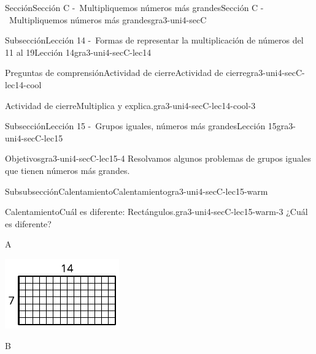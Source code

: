 \documentclass[twoside,10pt,]{article}
\begin{document}
\begin{sectionptx}{Sección}{Sección C -~Multipliquemos números más grandes}{}{Sección C -~Multipliquemos números más grandes}{}{}{gra3-uni4-secC}
\begin{subsectionptx}{Subsección}{Lección 14 -~Formas de representar la multiplicación de números del 11 al 19}{}{Lección 14}{}{}{gra3-uni4-secC-lec14}
\begin{reading-questions-subsubsection}{Preguntas de comprensión}{Actividad de cierre}{}{Actividad de cierre}{}{}{gra3-uni4-secC-lec14-cool}
\begin{project}{Actividad de cierre}{Multiplica y explica.}{gra3-uni4-secC-lec14-cool-3}
\begin{sidebyside}{2}{0}{0}{0}
\end{sidebyside}%
\end{project}%
\end{reading-questions-subsubsection}
\end{subsectionptx}
%
%
\typeout{************************************************}
\typeout{************************************************}
%
\begin{subsectionptx}{Subsección}{Lección 15 -~Grupos iguales, números más grandes}{}{Lección 15}{}{}{gra3-uni4-secC-lec15}
\begin{objectives}{Objetivos}{gra3-uni4-secC-lec15-4}
Resolvamos algunos problemas de grupos iguales que tienen números más grandes.%
\end{objectives}
%
%
\typeout{************************************************}
\typeout{************************************************}
%
\begin{subsubsectionptx}{Subsubsección}{Calentamiento}{}{Calentamiento}{}{}{gra3-uni4-secC-lec15-warm}
\begin{exploration}{Calentamiento}{Cuál es diferente: Rectángulos.}{gra3-uni4-secC-lec15-warm-3}%
¿Cuál es diferente?%
\begin{sidebyside}{2}{0}{0}{0}%
\begin{sbspanel}{0.5}%
A%
\par
\includegraphics[width=\linewidth]{external/svg-source/tikz-file-149350.pdf}
\end{sbspanel}%
\begin{sbspanel}{0.5}%
B%
\par

\end{sbspanel}
\end{sidebyside}
\end{exploration}
\end{subsubsectionptx}
\end{subsectionptx}
\end{sectionptx}
\end{document}
